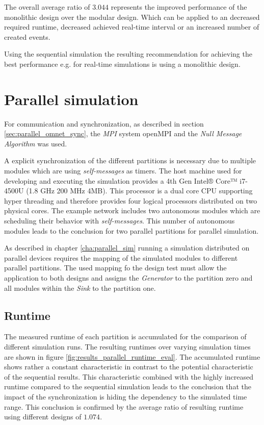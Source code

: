 The overall average ratio of $3.044$ represents the improved performance of the monolithic design over the modular design.
Which can be applied to an decreased required runtime, decreased achieved real-time interval or an increased number of created events.

Using the sequential simulation the resulting recommendation for achieving the best performance e.g. for real-time simulations is using a monolithic design.

\section{Parallel simulation}
\label{sec:measurements_parallel}
For communication and synchronization, as described in section \ref{sec:parallel_omnet_sync}, the \emph{MPI} system openMPI and the \emph{Null Message Algorithm} was used.

A explicit synchronization of the different partitions is necessary due to multiple modules which are using \emph{self-messages} as timers.
The host machine used for developing and executing the simulation provides a 4th Gen Intel® Core™ i7-4500U (1.8 GHz 200 MHz 4MB).
This processor is a dual core CPU supporting hyper threading and therefore provides four logical processors distributed on two physical cores.
The example network includes two autonomous modules which are scheduling their behavior with \emph{self-messages}.
This number of autonomous modules leads to the conclusion for two parallel partitions for parallel simulation.

As described in chapter \ref{cha:parallel_sim} running a simulation distributed on parallel devices requires the mapping of the simulated modules to different parallel partitions.
The used mapping  fo the design test must allow the application to both designs and assigns the \emph{Generator} to the partition zero and all modules within the \emph{Sink} to the partition one.

\subsection{Runtime}
\label{sec:measurements_parallel_runtime}

The measured runtime of each partition is accumulated for the comparison of different simulation runs.
The resulting runtimes over varying simulation times are shown in figure \ref{fig:results_parallel_runtime_eval}.
The accumulated runtime shows rather a constant characteristic in contrast to the potential characteristic of the sequential results.
This characteristic combined with the highly increased runtime compared to the sequential simulation leads to the conclusion that the impact of the synchronization is hiding the dependency to the simulated time range.
This conclusion is confirmed by the average ratio of resulting runtime using different designs of $1.074$.
\\

